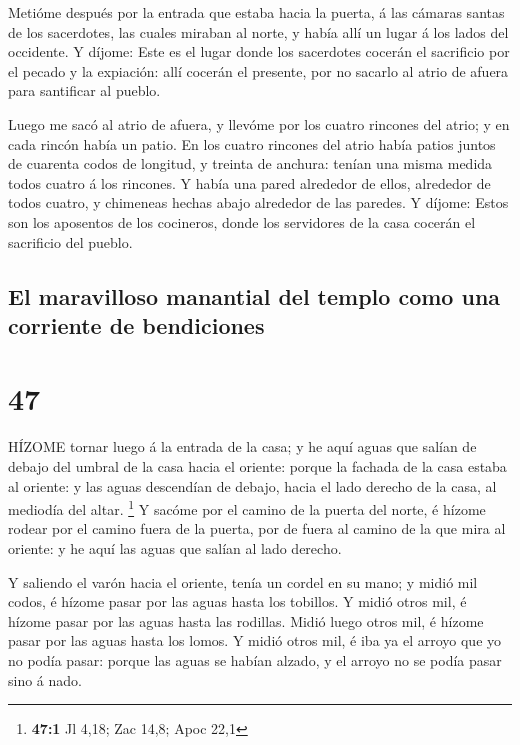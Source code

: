  Metióme después por la entrada que estaba hacia la puerta,
á las cámaras santas de los sacerdotes, las cuales miraban al norte, y
había allí un lugar á los lados del occidente.  Y díjome:
Este es el lugar donde los sacerdotes cocerán el sacrificio por el
pecado y la expiación: allí cocerán el presente, por no sacarlo al atrio
de afuera para santificar al pueblo.

 Luego me sacó al atrio de afuera, y llevóme por los cuatro
rincones del atrio; y en cada rincón había un patio.  En
los cuatro rincones del atrio había patios juntos de cuarenta codos de
longitud, y treinta de anchura: tenían una misma medida todos cuatro á
los rincones.  Y había una pared alrededor de ellos,
alrededor de todos cuatro, y chimeneas hechas abajo alrededor de las
paredes.  Y díjome: Estos son los aposentos de los
cocineros, donde los servidores de la casa cocerán el sacrificio del
pueblo.

\hypertarget{el-maravilloso-manantial-del-templo-como-una-corriente-de-bendiciones}{%
\subsection{El maravilloso manantial del templo como una corriente de
bendiciones}\label{el-maravilloso-manantial-del-templo-como-una-corriente-de-bendiciones}}

\hypertarget{section-46}{%
\section{47}\label{section-46}}

 HÍZOME tornar luego á la entrada de la casa; y he aquí
aguas que salían de debajo del umbral de la casa hacia el oriente:
porque la fachada de la casa estaba al oriente: y las aguas descendían
de debajo, hacia el lado derecho de la casa, al mediodía del altar.
\footnote{\textbf{47:1} Jl 4,18; Zac 14,8; Apoc 22,1}  Y
sacóme por el camino de la puerta del norte, é hízome rodear por el
camino fuera de la puerta, por de fuera al camino de la que mira al
oriente: y he aquí las aguas que salían al lado derecho.

 Y saliendo el varón hacia el oriente, tenía un cordel en su
mano; y midió mil codos, é hízome pasar por las aguas hasta los
tobillos.  Y midió otros mil, é hízome pasar por las aguas
hasta las rodillas. Midió luego otros mil, é hízome pasar por las aguas
hasta los lomos.  Y midió otros mil, é iba ya el arroyo que
yo no podía pasar: porque las aguas se habían alzado, y el arroyo no se
podía pasar sino á nado.

